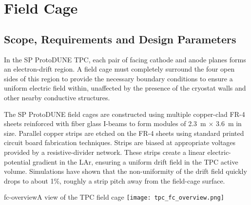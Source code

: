 



\section{Field Cage}

\subsection{Scope, Requirements and Design Parameters}

In the SP ProtoDUNE TPC, each pair of facing cathode and anode planes forms an
electron-drift region. A field cage must completely surround the four
open sides of this region to provide the necessary boundary conditions
to ensure a uniform electric field within, unaffected by the presence
of the cryostat walls and other nearby conductive structures.

The SP ProtoDUNE field cages are
constructed using multiple copper-clad FR-4 sheets reinforced with
fiber glass I-beams to form modules of 2.3~m $\times$ 3.6~m in
size. Parallel copper strips are etched on the FR-4 sheets using
standard printed circuit board fabrication techniques. Strips are
biased at appropriate voltages provided by a resistive-divider 
network. These strips create a linear electric-potential gradient in
the LAr, ensuring a uniform drift field in the TPC active volume. 
Simulations have shown that the non-uniformity of the drift field quickly
drops to about 1\%, roughly a strip pitch away from the field-cage
surface.

\begin{cdrfigure}{fc-overview}{A view of the TPC field cage}
\texttt{[image: tpc\_fc\_overview.png]}
\end{cdrfigure}


